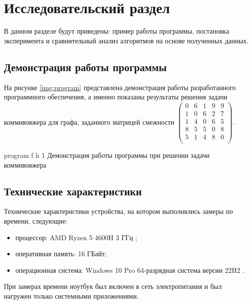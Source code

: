 \chapter{Исследовательский раздел}

В данном разделе будут приведены: пример работы программы, постановка эксперимента и сравнительный анализ алгоритмов на основе полученных данных.

\section{Демонстрация работы программы}

На рисунке \ref{img:program} представлена демонстрация работы разработанного программного обеспечения, а именно показаны результаты решения задачи коммивояжера для графа, заданного матрицей смежности $\begin{pmatrix}
	0 & 6 & 1 & 9 & 9 \\
	1 & 0 & 6 & 2 & 7 \\
	1 & 4 & 0 & 6 & 5 \\
	8 & 5 & 5 & 0 & 8 \\
	5 & 1 & 4 & 8 & 0 \\
\end{pmatrix}$.  
\clearpage

{program} %
{f} %
{h} %
{1\textwidth} %
{Демонстрация работы программы при решении задачи коммивояжера} %

\clearpage


\section{Технические характеристики}

Технические характеристики устройства, на котором выполнялись замеры по времени, следующие:
\begin{itemize}
	\item процессор: AMD Ryzen 5 4600H 3 ГГц \cite{amd};
	\item оперативная память: 16 ГБайт;
	\item операционная система: Windows 10 Pro 64-разрядная система версии 22H2 \cite{windows}.
\end{itemize}

При замерах времени ноутбук был включен в сеть электропитания и был нагружен только системными приложениями.

